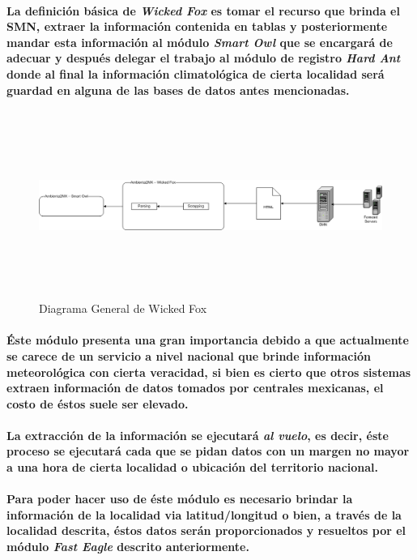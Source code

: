     \paragraph{ La definición básica de \textbf{\emph{Wicked Fox}} es tomar el recurso que brinda el SMN, extraer la información contenida en tablas y posteriormente mandar esta información al módulo \textbf{\emph{Smart Owl}} que se encargará de adecuar y después delegar el trabajo al módulo de registro \textbf{\emph{Hard Ant}} donde al final la información climatológica de cierta localidad será guardad en alguna de las bases de datos antes mencionadas.}
      \begin{landscape}
        \begin{figure}[b!]
        \centering
        \includegraphics[width=14cm,height=6cm]{./images/DiagramaWickedFox.png}
        \caption{Diagrama General de Wicked Fox}
      \end{figure}
      \end{landscape}
    \paragraph{Éste módulo presenta una gran importancia debido a que actualmente se carece de un servicio a nivel nacional que brinde información meteorológica con cierta veracidad, si bien es cierto que otros sistemas extraen información de datos tomados por centrales mexicanas, el costo de éstos suele ser elevado.}
    \paragraph{La extracción de la información se ejecutará \emph{al vuelo}, es decir, éste proceso se ejecutará cada que se pidan datos con un margen no mayor a una hora de cierta localidad o ubicación del territorio nacional.}
    \paragraph{Para poder hacer uso de éste módulo es necesario brindar la información de la localidad via latitud/longitud o bien, a través de la localidad descrita, éstos datos serán proporcionados y resueltos por el módulo \textbf{\emph{Fast Eagle}} descrito anteriormente.}
